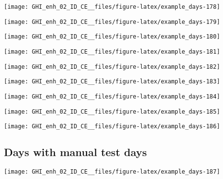 \documentclass[
  10pt,
  a4paper,oneside]{article}
\begin{document}
\begin{center}\texttt{[image: GHI\_enh\_02\_ID\_CE\_\_files/figure-latex/example\_days-178]} \end{center}

\begin{center}\texttt{[image: GHI\_enh\_02\_ID\_CE\_\_files/figure-latex/example\_days-179]} \end{center}

\begin{center}\texttt{[image: GHI\_enh\_02\_ID\_CE\_\_files/figure-latex/example\_days-180]} \end{center}

\begin{center}\texttt{[image: GHI\_enh\_02\_ID\_CE\_\_files/figure-latex/example\_days-181]} \end{center}

\begin{center}\texttt{[image: GHI\_enh\_02\_ID\_CE\_\_files/figure-latex/example\_days-182]} \end{center}

\begin{center}\texttt{[image: GHI\_enh\_02\_ID\_CE\_\_files/figure-latex/example\_days-183]} \end{center}

\begin{center}\texttt{[image: GHI\_enh\_02\_ID\_CE\_\_files/figure-latex/example\_days-184]} \end{center}

\begin{center}\texttt{[image: GHI\_enh\_02\_ID\_CE\_\_files/figure-latex/example\_days-185]} \end{center}

\begin{center}\texttt{[image: GHI\_enh\_02\_ID\_CE\_\_files/figure-latex/example\_days-186]} \end{center}

\FloatBarrier

\hypertarget{days-with-manual-test-days}{%
\subsection{Days with manual test days}\label{days-with-manual-test-days}}

\begin{center}\texttt{[image: GHI\_enh\_02\_ID\_CE\_\_files/figure-latex/example\_days-187]} \end{center}
\end{document}
